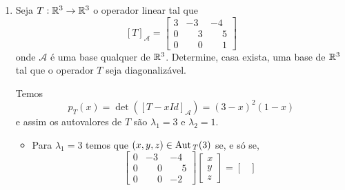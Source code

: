 \begin{exemplo}
\begin{enumerate}[label={\arabic*})]
\begin{solucao}
\begin{itemize}
\[                \]
                isto \'e, $x = -iy$. Logo
                \[
                    \aut_T(-i) = \{(-iy,y) \in \complex^2 \mid y \in \complex\} = [(-i,1)].
                \]
                Assim, $\mathcal{B}_2 = \{(-i,1)\}$ \'e uma base de $\aut_T(-i)$ e da{\'\i} $\dim_\complex\aut_T(-i) = 1$.
            \end{itemize}
            Agora o conjunto $\mathcal{B} = \mathcal{B}_1 \cup \mathcal{B}_2 = \{(i,1);(-i,1)\}$ \'e uma base de $\complex^2$ e nesta base temos
            \[
                [T]_\mathcal{B} = \begin{bmatrix} i & \phantom{-}0\\0 & -i\end{bmatrix}.
            \]
        \end{solucao}
        \item Seja $T : \mathbb{R}^3 \to \mathbb{R}^3$ o operador linear tal que
        \[
            [T]_\mathcal{A} = \begin{bmatrix}
                                3 & -3 & -4\\
                                0 & \phantom{-}3 & \phantom{-}5\\
                                0 & \phantom{-}0 & \phantom{-}1
                            \end{bmatrix}
        \]
        onde $\mathcal{A}$ \'e uma base qualquer de $\mathbb{R}^3$. Determine, casa exista, uma base de $\mathbb{R}^3$ tal que o operador $T$ seja diagonaliz\'avel.
        \begin{solucao}
            Temos
            \[
                p_T(x) = \det([T - xId]_\mathcal{A}) = (3 - x)^2(1 - x)
            \]
            e assim os autovalores de $T$ s\~ao $\lambda_1 = 3$ e $\lambda_2 = 1$.
            \begin{itemize}
                \item Para $\lambda_1 = 3$ temos que $(x,y,z) \in {\rm Aut\,}_T(3)$ se, e s\'o se,
                \[
                    \begin{bmatrix}
                        0 & -3 & -4\\
                        0 & \phantom{-}0 & \phantom{-}5\\
                        0 & \phantom{-}0 & -2
                    \end{bmatrix}\begin{bmatrix}
                        x\\y\\z
                    \end{bmatrix} = \begin{bmatrix}

\end{bmatrix}\]
\end{itemize}
\end{solucao}
\end{enumerate}
\end{exemplo}
